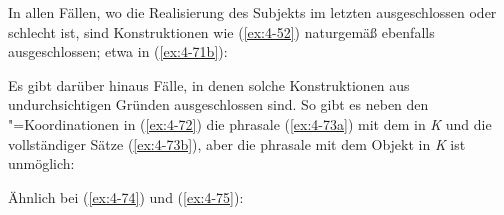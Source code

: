 \documentclass[output=paper]{langsci/langscibook}
\begin{document}
\addlines
In allen Fällen, wo die Realisierung des Subjekts im letzten  ausgeschlossen oder schlecht ist, sind Konstruktionen wie (\ref{ex:4-52}) naturgemäß ebenfalls ausgeschlossen; etwa in (\ref{ex:4-71b}):

\begin{exe}
\ex
\label{ex:4-71}
\begin{xlist}

\end{xlist}
\end{exe}
Es gibt darüber hinaus Fälle, in denen solche Konstruktionen aus undurchsichtigen Gründen ausgeschlossen sind. So gibt es neben den "=Koordinationen in (\ref{ex:4-72}) die phrasale  (\ref{ex:4-73a}) mit dem  in \textit{K} und die  vollständiger Sätze (\ref{ex:4-73b}), aber die phrasale  mit dem Objekt in \textit{K} ist unmöglich:


\begin{exe}
\ex
\label{ex:4-72}
\begin{xlist}
\end{xlist}
\ex
\label{ex:4-73}
\begin{xlist}


\end{xlist}
\end{exe}
Ähnlich bei (\ref{ex:4-74}) und (\ref{ex:4-75}):
\end{document}
